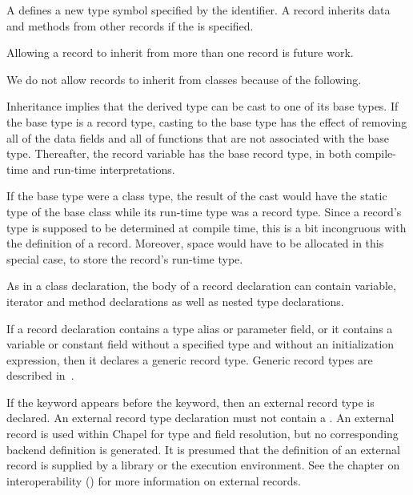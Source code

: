 A  defines a new type symbol specified by the
identifier.  A record inherits data and methods from other records
if the  is specified.

\begin{future}
Allowing a record to inherit from more than one record is future work.
\end{future}

\begin{rationale}
We do not allow records to inherit from classes because of the following.

Inheritance implies that the derived type can be cast to one of its base types.
If the base type is a record type, casting to the base type has the effect of
removing all of the data fields and all of functions that are not associated
with the base type.  Thereafter, the record variable has the base record type,
in both compile-time and run-time interpretations.

If the base type were a class type, the result of the cast would have the static
type of the base class while its run-time type was a record type.  Since a
record's type is supposed to be determined at compile time, this is a bit
incongruous with the definition of a record.  Moreover, space would have to be
allocated in this special case, to store the record's run-time type.
\end{rationale}

As in a class declaration, the body of a record declaration can contain
variable, iterator and method declarations as well as nested type declarations.

If a record declaration contains a type alias or parameter field, or it contains
a variable or constant field without a specified type and without an initialization
expression, then it declares a generic record type.  Generic record types are
described in~.

If the  keyword appears before the  keyword, then an
external record type is declared.  An external record type declaration must not
contain a .  An external record is used within Chapel
for type and field resolution, but no corresponding backend definition is
generated.  It is presumed that the definition of an external record is supplied
by a library or the execution environment.  See the chapter on interoperability
() for more information on external records.

